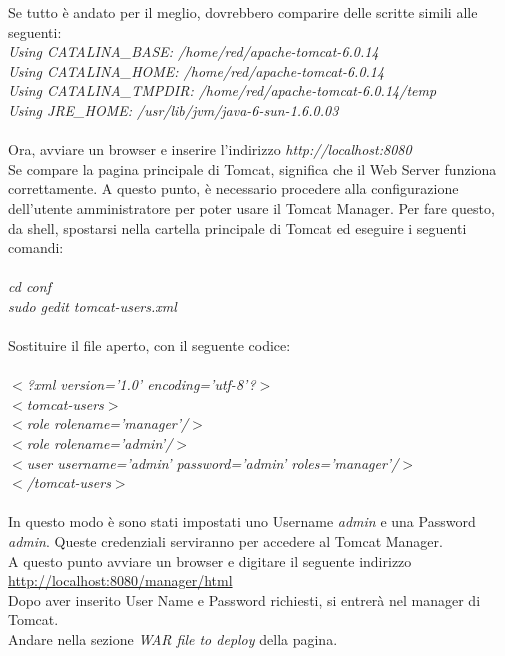 Se tutto \`e andato per il meglio, dovrebbero comparire delle scritte simili alle seguenti:\\

\textit{Using CATALINA{\_}BASE: /home/red/apache-tomcat-6.0.14}\\
\textit{Using CATALINA{\_}HOME: /home/red/apache-tomcat-6.0.14}\\
\textit{Using CATALINA{\_}TMPDIR: /home/red/apache-tomcat-6.0.14/temp}\\
\textit{Using JRE{\_}HOME: /usr/lib/jvm/java-6-sun-1.6.0.03}\\
\\

Ora, avviare un browser e inserire l'indirizzo \textit{http://localhost:8080}\\
Se compare la pagina principale di Tomcat, significa che il Web Server funziona correttamente.
A questo punto, \`e necessario procedere alla configurazione dell'utente amministratore per poter usare il Tomcat Manager.
Per fare questo, da shell, spostarsi nella cartella principale di Tomcat ed eseguire i seguenti comandi:\\
\\
\textit{cd conf}\\
\textit{sudo gedit tomcat-users.xml}\\
\\
Sostituire il file aperto, con il seguente codice:\\
\\
\textit{$ < $?xml version='1.0' encoding='utf-8'?$ > $}\\
\textit{$ < $tomcat-users$ > $}\\
\textit{ $ < $role rolename='manager'/$ > $}\\
\textit{ $ < $role rolename='admin'/$ > $}\\
\textit{ $ < $user username='admin' password='admin' roles='manager'/$ > $}\\
\textit{$ < $/tomcat-users$ > $} \\
\\
In questo modo \`e sono stati impostati uno Username  \textit{admin} e una Password  \textit{admin}. Queste credenziali serviranno per accedere al Tomcat Manager.\\
A questo punto avviare un browser e digitare il seguente indirizzo\\ \href{http://localhost:8080/manager/html}{http://localhost:8080/manager/html}\\
Dopo aver inserito User Name e Password richiesti, si entrer\`a nel manager di Tomcat.\\
Andare nella sezione \textit{WAR file to deploy} della pagina.\\

